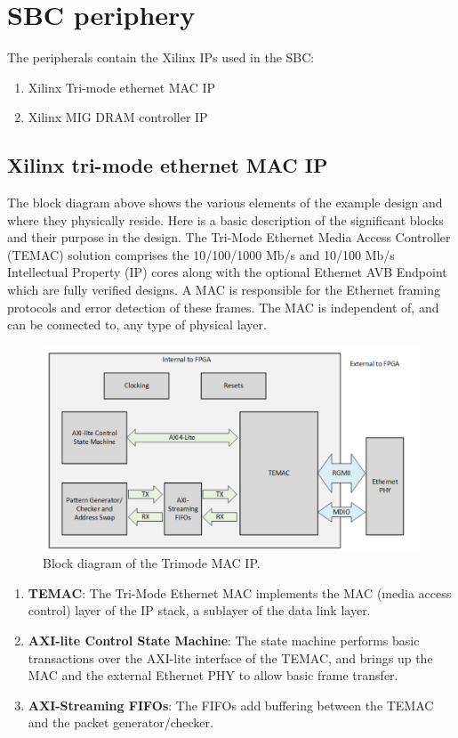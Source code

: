 \documentclass[12pt]{report}
\begin{document}
\newpage
\section{SBC periphery}
The peripherals contain the Xilinx IPs used in the SBC:
\begin{enumerate}
    \item Xilinx Tri-mode ethernet MAC IP   
    \item Xilinx MIG DRAM controller IP
\end{enumerate}
\subsection{Xilinx tri-mode ethernet MAC IP}

The block diagram above shows the various elements of the example design and where they physically reside. Here is a basic
description of the significant blocks and their purpose in the design. The Tri-Mode Ethernet Media Access Controller (TEMAC) solution comprises the 10/100/1000 Mb/s and 10/100 Mb/s Intellectual Property (IP) cores along with the optional Ethernet AVB Endpoint which are fully verified designs. A MAC is responsible for the Ethernet framing protocols and error detection of these frames. The MAC is independent of, and can be connected to, any type of physical layer.

\begin{figure}[h]
			\centering
			\includegraphics[width=14cm]{../figures/MAC_IP.png}
			\caption{Block diagram of the Trimode MAC IP.}
			
		\end{figure}

\begin{enumerate}

    \item \textbf{TEMAC}: The Tri-Mode Ethernet MAC implements the MAC (media access control) layer of the IP stack, a sublayer of the data link layer.

    \item \textbf{AXI-lite Control State Machine}: The state machine performs basic transactions over the AXI-lite interface of the TEMAC, and brings up the MAC and the external Ethernet PHY to allow basic frame transfer.

    \item \textbf{AXI-Streaming FIFOs}: The FIFOs add buffering between the TEMAC and the packet generator/checker. 
    
\end{enumerate}
\end{document}
